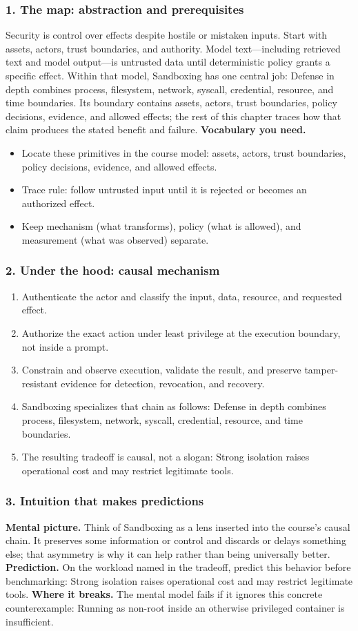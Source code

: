 \subsubsection*{1. The map: abstraction and prerequisites}
Security is control over effects despite hostile or mistaken inputs. Start with assets, actors, trust boundaries, and authority. Model text—including retrieved text and model output—is untrusted data until deterministic policy grants a specific effect.
Within that model, Sandboxing has one central job: Defense in depth combines process, filesystem, network, syscall, credential, resource, and time boundaries. Its boundary contains assets, actors, trust boundaries, policy decisions, evidence, and allowed effects; the rest of this chapter traces how that claim produces the stated benefit and failure.
\textbf{Vocabulary you need.}\begin{itemize}
\item Locate these primitives in the course model: assets, actors, trust boundaries, policy decisions, evidence, and allowed effects.
\item Trace rule: follow untrusted input until it is rejected or becomes an authorized effect.
\item Keep mechanism (what transforms), policy (what is allowed), and measurement (what was observed) separate.
\end{itemize}
\subsubsection*{2. Under the hood: causal mechanism}\begin{enumerate}
\item Authenticate the actor and classify the input, data, resource, and requested effect.
\item Authorize the exact action under least privilege at the execution boundary, not inside a prompt.
\item Constrain and observe execution, validate the result, and preserve tamper-resistant evidence for detection, revocation, and recovery.
\item Sandboxing specializes that chain as follows: Defense in depth combines process, filesystem, network, syscall, credential, resource, and time boundaries.
\item The resulting tradeoff is causal, not a slogan: Strong isolation raises operational cost and may restrict legitimate tools.
\end{enumerate}
\subsubsection*{3. Intuition that makes predictions}
\textbf{Mental picture.} Think of Sandboxing as a lens inserted into the course's causal chain. It preserves some information or control and discards or delays something else; that asymmetry is why it can help rather than being universally better.
\textbf{Prediction.} On the workload named in the tradeoff, predict this behavior before benchmarking: Strong isolation raises operational cost and may restrict legitimate tools.
\textbf{Where it breaks.} The mental model fails if it ignores this concrete counterexample: Running as non-root inside an otherwise privileged container is insufficient.
